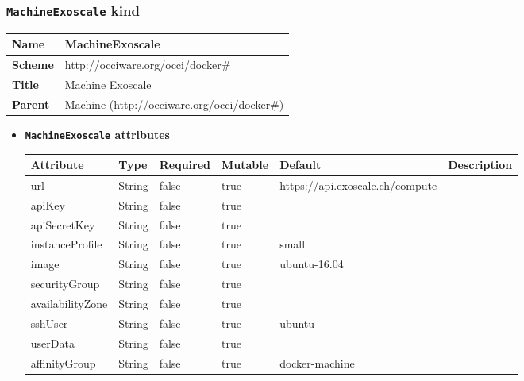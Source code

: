 \subsubsection{\texttt{MachineExoscale} kind}
\begin{center}
\begin{tabular}{|l|l|}
  \hline
  \textbf{Name} & MachineExoscale \\
  \hline  
  \textbf{Scheme} & http://occiware.org/occi/docker\# \\
  \hline
  \textbf{Title} & Machine Exoscale \\
  \hline
  \textbf{Parent} & Machine (http://occiware.org/occi/docker\#) \\
  \hline
\end{tabular}
\end{center}
\begin{itemize}
\item \textbf{\texttt{MachineExoscale} attributes}

\begin{tabularx}{\textwidth}{|l|l|p{1.4cm}|p{1.3cm}|l|X|}
  \hline
  \textbf{Attribute} & \textbf{Type} & \textbf{Required} & \textbf{Mutable} & \textbf{Default} & \textbf{Description} \\
  \hline  
  url & String & false & true & https://api.exoscale.ch/compute &  \\
  \hline
  apiKey & String & false & true &  &  \\
  \hline
  apiSecretKey & String & false & true &  &  \\
  \hline
  instanceProfile & String & false & true & small &  \\
  \hline
  image & String & false & true & ubuntu-16.04 &  \\
  \hline
  securityGroup & String & false & true &  &  \\
  \hline
  availabilityZone & String & false & true &  &  \\
  \hline
  sshUser & String & false & true & ubuntu &  \\
  \hline
  userData & String & false & true &  &  \\
  \hline
  affinityGroup & String & false & true & docker-machine &  \\
  \hline
\end{tabularx}
\end{itemize}




